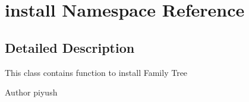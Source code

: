\hypertarget{namespaceinstall}{\section{install Namespace Reference}
\label{namespaceinstall}
}


\subsection{Detailed Description}
This class contains function to install Family Tree

\begin{DoxyAuthor}{Author}
piyush 
\end{DoxyAuthor}
